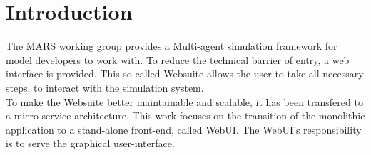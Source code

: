 
\chapter{Introduction}
The MARS working group provides a Multi-agent simulation framework for model developers to work with. To reduce the technical barrier of entry, a web interface is provided. This  so called Websuite allows the user to take all necessary steps, to interact with the simulation system.\\
To make the Websuite better maintainable and scalable, it has been transfered to a micro-service architecture. This work focuses on the transition of the monolithic application to a stand-alone front-end, called WebUI. The WebUI's responsibility is to serve the graphical user-interface.
